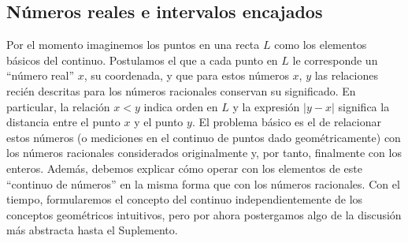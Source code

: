 \documentclass[12pt]{book}
\theoremstyle{definition}
\begin{document}
\subsection{Números reales e intervalos encajados}

Por el momento imaginemos los puntos en una recta $L$ como los elementos básicos del continuo. Postulamos el que a cada punto en $L$ le corresponde un ``número real'' $x$, su coordenada, y que para estos números $x$, $y$ las relaciones recién descritas para los números racionales conservan su significado. En particular, la relación $x < y$ indica orden en $L$ y la expresión $|y - x|$ significa la distancia entre el punto $x$ y el punto $y$. El problema básico es el de relacionar estos números (o mediciones en el continuo de puntos dado geométricamente) con los números racionales considerados originalmente y, por tanto, finalmente con los enteros. Además, debemos explicar cómo operar con los elementos de este ``continuo de números'' en la misma forma que con los números racionales. Con el tiempo, formularemos el concepto del continuo independientemente de los conceptos geométricos intuitivos, pero por ahora postergamos algo de la discusión más abstracta hasta el Suplemento.
\end{document}
